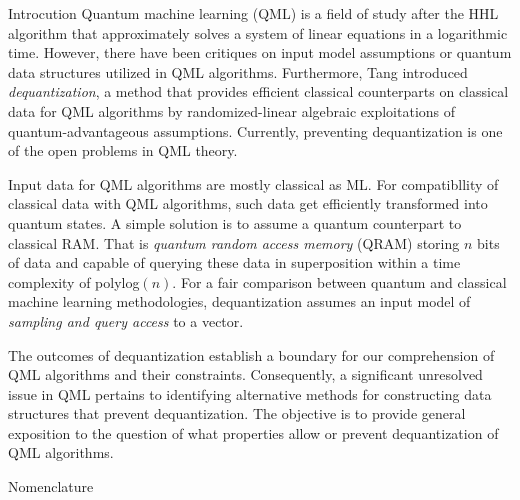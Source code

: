 \documentclass[10pt,twoside,reqno]{amsart} %
\makeatletter
\renewcommand{\section}{\@startsection{section}{1}
   \z@{.7\linespacing\@plus\linespacing}{.5\linespacing}
   {\normalfont\upshape\bfseries\centering}}
\theoremstyle{plain}
\theoremstyle{definition}
\makeatother
\begin{document}
\bigskip
\section{Introcution}
Quantum machine learning (QML) is a field of study after the HHL algorithm
\cite{harrow2009} that approximately solves a system of linear equations in a
logarithmic time. However, there have been critiques \cite{aaronson2015} on input
model assumptions or quantum data structures utilized in QML algorithms. Furthermore,
Tang \cite{tang2019} introduced \emph{dequantization}, a method that provides efficient
classical counterparts on classical data for QML algorithms by randomized-linear
algebraic exploitations of quantum-advantageous assumptions. Currently, preventing
dequantization is one of the open problems \cite{tang2023} in QML theory.


Input data for QML algorithms are mostly classical as ML. For compatibllity of classical 
data with QML algorithms, such data get efficiently transformed
into quantum states. A simple solution is to assume a quantum counterpart to classical
RAM. That is \emph{quantum random access memory} (QRAM) storing $n$ bits of data and
capable of querying these data in superposition within a time complexity of polylog$(n)$.
For a fair comparison between quantum and classical machine learning methodologies,
dequantization assumes an input model of \emph{sampling and query access} to a vector.

The outcomes of dequantization establish a boundary for our comprehension of QML
algorithms and their constraints. Consequently, a significant unresolved issue
in QML pertains to identifying alternative methods for constructing data 
structures that prevent dequantization. The objective is to provide general exposition
to the question of what properties allow or prevent dequantization of QML algorithms.

\section{Nomenclature}
\end{document}
